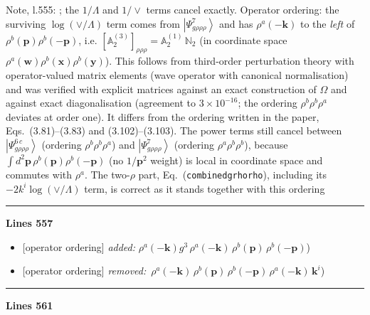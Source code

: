 \documentclass[10pt]{article}
\newenvironment{notebox}{\def\FrameCommand{{\color{notebar}\vrule width 1.5pt}\hspace{6pt}}\MakeFramed{\advance\hsize-\width\FrameRestore}\small}{\endMakeFramed}
\def\mf#1{\mathbb{#1}}
\begin{document}
\begin{notebox}\textsf{\small Note, l.555:} ; the $1/\Lambda$ and $1/\vee$ terms cancel exactly. Operator ordering: the surviving $\log(\vee/\Lambda)$ term comes from $\left|\Psi^{7}_{g\rho\rho\rho}\right\rangle$ and has $\rho^a(-\mathbf{k})$ to the \emph{left} of $\rho^b(\mathbf{p})\rho^b(-\mathbf{p})$, i.e. $[\mf{A}^{(3)}_2]_{\rho\rho\rho}=\mf{A}^{(1)}_2\,\mf{N}_2$ (in coordinate space $\rho^a(\mathbf{w})\rho^b(\mathbf{x})\rho^b(\mathbf{y})$). This follows from third-order perturbation theory with operator-valued matrix elements (wave operator with canonical normalisation) and was verified with explicit matrices against an exact construction of $\Omega$ and against exact diagonalisation (agreement to $3\times10^{-16}$; the ordering $\rho^b\rho^b\rho^a$ deviates at order one). It differs from the ordering written in the paper, Eqs.~(3.81)--(3.83) and (3.102)--(3.103). The power terms still cancel between $\left|\Psi^{6\,c}_{g\rho\rho\rho}\right\rangle$ (ordering $\rho^b\rho^b\rho^a$) and $\left|\Psi^{7}_{g\rho\rho\rho}\right\rangle$ (ordering $\rho^a\rho^b\rho^b$), because $\int d^{2}\mathbf{p}\,\rho^b(\mathbf{p})\rho^b(-\mathbf{p})$ (no $1/\mathbf{p}^2$ weight) is local in coordinate space and commutes with $\rho^a$. The two-$\rho$ part, Eq.~(\texttt{combinedgrhorho}), including its $-2k^i\log(\vee/\Lambda)$ term, is correct as it stands together with this ordering\end{notebox}
\noindent\rule{\linewidth}{0.3pt}\par\noindent\textbf{Lines 557} \par
\begin{itemize}[leftmargin=2.2em,itemsep=1pt,topsep=2pt]
\item[\textbf{l.557}] \textsf{\small [operator ordering]} \emph{added:} $\displaystyle \rho^{a}(-\mathbf{k})$$\displaystyle g^{3}\,\rho^{a}(-\mathbf{k})\,\rho^{b}(\mathbf{p})\,\rho^{b}(-\mathbf{p})${\color{gray}\small)}
\item[\textbf{l.557}] \textsf{\small [operator ordering]} \emph{removed:} $\displaystyle \,\rho^{a}(-\mathbf{k})$$\displaystyle \,\rho^{b}(\mathbf{p})\,\rho^{b}(-\mathbf{p})\,\rho^{a}(-\mathbf{k})\, \mathbf{k}^{i}${\color{gray}\small)}
\end{itemize}
\noindent\rule{\linewidth}{0.3pt}\par\noindent\textbf{Lines 561} \par
\end{document}
